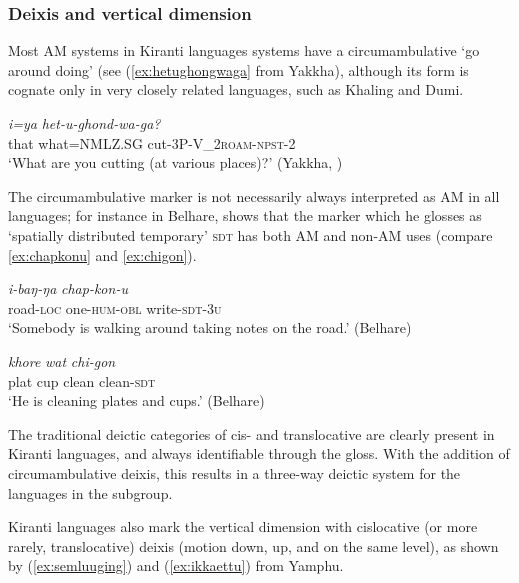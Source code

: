 \documentclass[oneside,a4paper,11pt]{article}
\newcommand{\ipa}[1]{{\phon\textit{#1}}}
\newcommand{\sens}[1]{‘#1’}
\newcommand{\rouge}[1]{{\color{red}#1}}
\begin{document}
 \subsubsection{Deixis and vertical dimension} \label{sec:vertical.khaling}
  Most AM systems in Kiranti languages systems have a circumambulative `go around doing' (see (\ref{ex:hetughongwaga} from Yakkha), although its form is cognate only in very closely related languages, such as Khaling and Dumi.   
  
  \begin{exe}
\ex \label{ex:hetughongwaga}
 \gll  \ipa{ŋkha}	\ipa{i=ya}	\ipa{het-u-\rouge{ghond}-wa-ga?} \\
that what=NMLZ.SG cut-3P-\rouge{V_2\textsc{roam}}-\textsc{npst}-2  \\
\glt \sens{What are you cutting (at various places)?} (Yakkha, \citealt[326]{schackow15yakkha})
\end{exe}
 
The circumambulative marker is not necessarily always interpreted as AM in all languages; for instance in Belhare, \citet[164]{bickel96aspect} shows that the marker which he glosses as `spatially distributed temporary' \textsc{sdt}  has both AM and non-AM uses (compare \ref{ex:chapkonu} and \ref{ex:chigon}). 
 
 \begin{exe}
\ex \label{ex:chapkonu}  
\gll \ipa{rot-de} \ipa{i-baŋ-ŋa} \ipa{chap-\rouge{kon}-u}  \\
road-\textsc{loc} one-\textsc{hum}-\textsc{obl} write-\textsc{\rouge{sdt}}-\textsc{3u} \\
\glt \sens{Somebody is walking around taking notes on the road.}  (Belhare)
\end{exe}

 \begin{exe}
\ex \label{ex:chigon}
\gll \ipa{thali} \ipa{khore} \ipa{wat} \ipa{chi-gon}    \\
plat cup clean clean-\textsc{sdt} \\
\glt \sens{He is cleaning plates and cups.} (Belhare)
\end{exe}


The traditional deictic categories of cis- and translocative are clearly present in Kiranti languages, and always identifiable through the gloss.  With the addition of circumambulative deixis, this results in a three-way deictic system for the languages in the subgroup.

Kiranti languages also mark the vertical dimension with cislocative (or more rarely, translocative) deixis (motion down, up, and on the same level), as shown by (\ref{ex:semluuging}) and (\ref{ex:ikkaettu}) from Yamphu.
 
\end{document}
